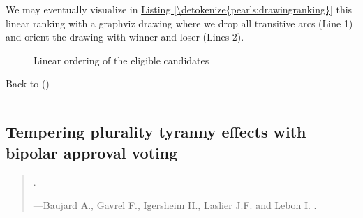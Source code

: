 \documentclass[a4paper,12pt,english]{sphinxhowto}
\let\sphinxpxdimen\pdfpxdimen\else\newdimen\sphinxpxdimen
\begin{document}
\sphinxAtStartPar
We may eventually visualize in \hyperref[\detokenize{pearls:drawingranking}]{Listing \ref{\detokenize{pearls:drawingranking}}} this linear ranking with a graphviz drawing where we drop all transitive arcs (Line 1) and orient the drawing with  winner  and loser  (Lines 2).
\def\sphinxLiteralBlockLabel{\label{\detokenize{pearls:drawingranking}}}
\begin{sphinxVerbatim}[commandchars=\\\{\},numbers=left,firstnumber=1,stepnumber=1]
\PYG{p}{[}\PYG{p}{]}\PYG{p}{[}\PYG{p}{]}
\end{sphinxVerbatim}

\begin{figure}[H]
\centering
\capstart

\noindent\sphinxincludegraphics[width=250\sphinxpxdimen]{{divGraph}.png}
\caption{Linear ordering of the eligible candidates}\label{\detokenize{pearls:divisivegraph}}\end{figure}

\sphinxAtStartPar
Back to {\hyperref[\detokenize{pearls:pearls-label}]{}} ()


\bigskip\hrule\bigskip



\subsection{Tempering plurality tyranny effects with bipolar approval voting}
\label{\detokenize{pearls:tempering-plurality-tyranny-effects-with-bipolar-approval-voting}}\label{\detokenize{pearls:tempering-plurality-label}}\begin{quote}

\sphinxAtStartPar
{}.

\begin{flushright}
---Baujard A., Gavrel F., Igersheim H., Laslier J.\sphinxhyphen{}F. and Lebon I. .
\end{flushright}
\end{quote}
\end{document}
